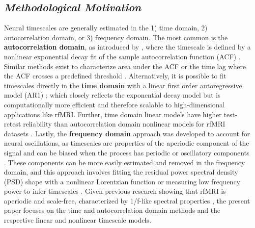 \documentclass[latex/main.tex]{subfiles}
\begin{document}
\subsection{\textit{Methodological Motivation}}
Neural timescales are generally estimated in the 1) time domain, 2) autocorrelation domain, or 3) frequency domain. The most common is the \textbf{autocorrelation domain}, as introduced by \citet{murray_hierarchy_2014}, where the timescale is defined by a nonlinear exponential decay fit of the sample autocorrelation function (ACF) \citep{rossi-pool_invariant_2021, cirillo_neural_2018, ito_cortical_2020, runyan_distinct_2017, zeraati_flexible_2022, nougaret_intrinsic_2021, wasmuht_intrinsic_2018, muller_core_2020, maisson_choice-relevant_2021, li_hierarchical_2022, shafiei_topographic_2020}. Similar methods exist to characterize area under the ACF \citep{wengler_distinct_2020, manea_intrinsic_2022, watanabe_atypical_2019} or the time lag where the ACF crosses a predefined threshold \citep{zilio_are_2021, raut_hierarchical_2020, golesorkhi_temporal_2021}. Alternatively, it is possible to fit timescales directly in the \textbf{time domain} with a linear first order autoregressive model (AR1) \citep{kaneoke_variance_2012, meisel_decline_2017, huang_timescales_2018, lurie_cortical_2024, shinn_functional_2023, shafiei_topographic_2020}; which closely reflects the exponential decay model \citep{murray_hierarchy_2014} but is computationally more efficient and therefore scalable to high-dimensional applications like rfMRI. Further, time domain linear models have higher test-retest reliability than autocorrelation domain nonlinear models for rfMRI datasets \citep{huang_timescales_2018, lurie_cortical_2024}. Lastly, the \textbf{frequency domain} approach was developed to account for neural oscillations, as timescales are properties of the aperiodic component of the signal and can be biased when the process has periodic or oscillatory components \citep{donoghue_parameterizing_2020, gao_neuronal_2020}. These components can be more easily estimated and removed in the frequency domain, and this approach involves fitting the residual power spectral density (PSD) shape with a nonlinear Lorentzian function or measuring low frequency power to infer timescales \citep{gao_neuronal_2020, manea_neural_2024, zeraati_flexible_2022, fallon_timescales_2020}. Given previous research showing that rfMRI is aperiodic and scale-free, characterized by 1/f-like spectral properties \citep{he_scale-free_2011, he_temporal_2010}, the present paper focuses on the time and autocorrelation domain methods and the respective linear and nonlinear timescale models.\\ 
\end{document}
